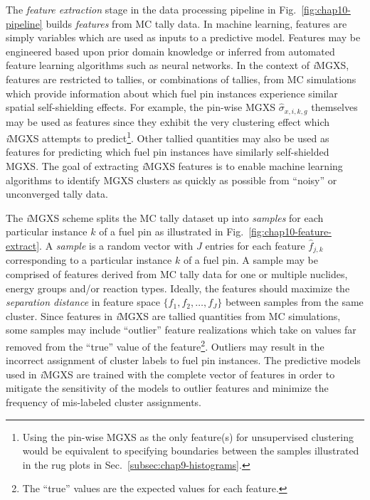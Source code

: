 The \textit{feature extraction} stage in the data processing pipeline in Fig.~\ref{fig:chap10-pipeline} builds \textit{features} from \ac{MC} tally data. In machine learning, features are simply variables which are used as inputs to a predictive model. Features may be engineered based upon prior domain knowledge or inferred from automated feature learning algorithms such as neural networks. In the context of \textit{i}\ac{MGXS}, features are restricted to tallies, or combinations of tallies, from \ac{MC} simulations which provide information about which fuel pin instances experience similar spatial self-shielding effects. For example, the pin-wise \ac{MGXS} $\hat{\sigma}_{x,i,k,g}$ themselves may be used as features since they exhibit the very clustering effect which \textit{i}\ac{MGXS} attempts to predict\footnote{Using the pin-wise \ac{MGXS} as the only feature(s) for unsupervised clustering would be equivalent to specifying boundaries between the samples illustrated in the rug plots in Sec.~\ref{subsec:chap9-histograms}.}. Other tallied quantities may also be used as features for predicting which fuel pin instances have similarly self-shielded \ac{MGXS}. The goal of extracting \textit{i}\ac{MGXS} features is to enable machine learning algorithms to identify \ac{MGXS} clusters as quickly as possible from ``noisy'' or unconverged tally data.

The \textit{i}\ac{MGXS} scheme splits the \ac{MC} tally dataset up into \textit{samples} for each particular instance $k$ of a fuel pin as illustrated in Fig.~\ref{fig:chap10-feature-extract}. A \textit{sample} is a random vector with $J$ entries for each feature $\hat{f}_{j,k}$ corresponding to a particular instance $k$ of a fuel pin. A sample may be comprised of features derived from \ac{MC} tally data for one or multiple nuclides, energy groups and/or reaction types. Ideally, the features should maximize the \textit{separation distance} in feature space $\{f_{1}, f_{2}, \dots, f_{J}\}$ between samples from the same cluster. Since features in \textit{i}\ac{MGXS} are tallied quantities from \ac{MC} simulations, some samples may include ``outlier'' feature realizations which take on values far removed from the ``true'' value of the feature\footnote{The ``true'' values are the expected values for each feature.}. Outliers may result in the incorrect assignment of cluster labels to fuel pin instances. The predictive models used in \textit{i}\ac{MGXS} are trained with the complete vector of features in order to mitigate the sensitivity of the models to outlier features and minimize the frequency of mis-labeled cluster assignments.

